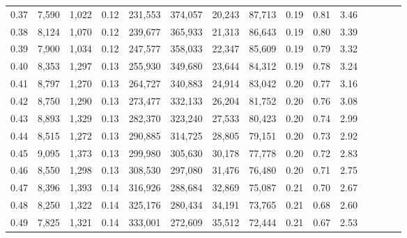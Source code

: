 \begin{tabular}{rrrcrrrrrrrrrrr}
0.37 &   7,590 &  1,022 &                                       0.12 &  231,553 &  374,057 &   20,243 &   87,713 &  0.19 &  0.81 &                         3.46 \\
0.38 &   8,124 &  1,070 &                                       0.12 &  239,677 &  365,933 &   21,313 &   86,643 &  0.19 &  0.80 &                         3.39 \\
0.39 &   7,900 &  1,034 &                                       0.12 &  247,577 &  358,033 &   22,347 &   85,609 &  0.19 &  0.79 &                         3.32 \\
0.40 &   8,353 &  1,297 &                                       0.13 &  255,930 &  349,680 &   23,644 &   84,312 &  0.19 &  0.78 &                         3.24 \\
0.41 &   8,797 &  1,270 &                                       0.13 &  264,727 &  340,883 &   24,914 &   83,042 &  0.20 &  0.77 &                         3.16 \\
0.42 &   8,750 &  1,290 &                                       0.13 &  273,477 &  332,133 &   26,204 &   81,752 &  0.20 &  0.76 &                         3.08 \\
0.43 &   8,893 &  1,329 &                                       0.13 &  282,370 &  323,240 &   27,533 &   80,423 &  0.20 &  0.74 &                         2.99 \\
0.44 &   8,515 &  1,272 &                                       0.13 &  290,885 &  314,725 &   28,805 &   79,151 &  0.20 &  0.73 &                         2.92 \\
0.45 &   9,095 &  1,373 &                                       0.13 &  299,980 &  305,630 &   30,178 &   77,778 &  0.20 &  0.72 &                         2.83 \\
0.46 &   8,550 &  1,298 &                                       0.13 &  308,530 &  297,080 &   31,476 &   76,480 &  0.20 &  0.71 &                         2.75 \\
0.47 &   8,396 &  1,393 &                                       0.14 &  316,926 &  288,684 &   32,869 &   75,087 &  0.21 &  0.70 &                         2.67 \\
0.48 &   8,250 &  1,322 &                                       0.14 &  325,176 &  280,434 &   34,191 &   73,765 &  0.21 &  0.68 &                         2.60 \\
0.49 &   7,825 &  1,321 &                                       0.14 &  333,001 &  272,609 &   35,512 &   72,444 &  0.21 &  0.67 &                         2.53 \\

\end{tabular}
